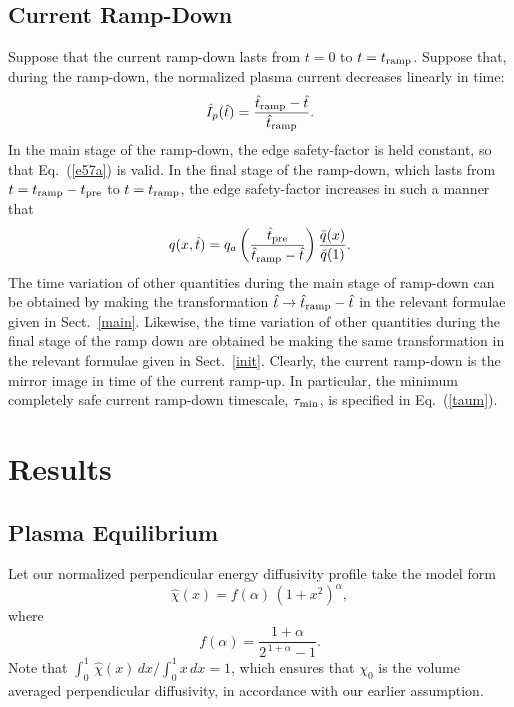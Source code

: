 \documentclass{iopjournal}
\begin{document}
\subsection{Current Ramp-Down}
Suppose that the current ramp-down lasts from $t=0$ to $t=t_{\rm ramp}$. Suppose that, during the ramp-down, 
the normalized plasma current decreases linearly in time:
\begin{equation}
\hat{I}_p(\hat{t}) = \frac{\hat{t}_{\rm ramp}-\hat{t}}{\hat{t}_{\rm ramp}}.
\end{equation}
In the main stage of the ramp-down, the edge safety-factor is held constant, so that Eq.~(\ref{e57a}) is valid.
In the final stage of the ramp-down, which lasts from $t=t_{\rm ramp}-t_{\rm pre}$ to $t=t_{\rm ramp}$,
the edge safety-factor increases in such a manner that 
\begin{equation}
q(x,\hat{t}) = q_a\left(\frac{\hat{t}_{\rm pre}}{\hat{t}_{\rm ramp}-\hat{t}}\right)\frac{\bar{q}(x)}{\bar{q}(1)}.
\end{equation}
The time variation of other quantities during the main stage of ramp-down can be obtained by making the transformation
$\hat{t}\rightarrow \hat{t}_{\rm ramp} - \hat{t}$ in the relevant formulae  given in Sect.~\ref{main}. Likewise,
the time variation of other quantities during the final stage of the ramp down are obtained be making the
same transformation in the relevant formulae given in Sect.~\ref{init}. Clearly, the current ramp-down is the mirror image in time of the current ramp-up.
In particular, the minimum completely safe current
ramp-down timescale, $\tau_{\rm min}$, is specified in Eq.~(\ref{taum}). 

\section{Results}
\subsection{Plasma Equilibrium}\label{equilb}
Let our normalized perpendicular energy diffusivity profile take the model form
\begin{equation}
\hat{\chi}(x) = f(\alpha)\,(1+x^2)^\alpha,
\end{equation}
where
\begin{equation}
f(\alpha) = \frac{1+\alpha}{2^{\,1+\alpha}-1}.
\end{equation}
Note that $\int_0^1\,\hat{\chi}(x)\,dx/\int_0^1x\,dx=1$, which ensures that $\chi_0$ is the volume averaged perpendicular diffusivity, in accordance with our earlier assumption. 
\end{document}
